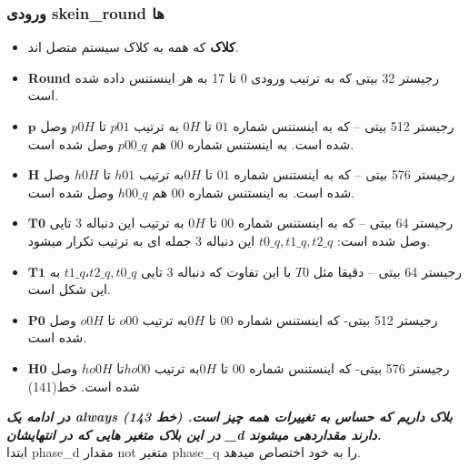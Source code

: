 \subsubsection{
	ورودی skein\_round ها
}
\begin{itemize}
	\item
	      \textbf{کلاک}
	      که همه به کلاک سیستم متصل اند.
	\item
	      \textbf{Round}
	      رجیستر 32 بیتی که به ترتیب ورودی 0 تا 17 به هر اینستنس داده شده است.
	\item
	      \textbf{$\textbf{p}$} 
	      رجیستر 512 بیتی – که به اینستنس شماره $01$ تا $0H$ به ترتیب $p01$ تا $p0H$ وصل شده است. به اینستنس شماره $00$ هم $p00\_q$ وصل شده است.
	\item
	      \textbf{$\textbf{H}$}
	      رجیستر 576 بیتی – که به اینستنس شماره $01$ تا $0H $به ترتیب $h01$ تا $h0H$ وصل شده است. به اینستنس شماره $00$ هم $h00\_q$ وصل شده است.
	\item
	      \textbf{$\textbf{T0}$}
	      رجیستر 64 بیتی –   که به اینستنس شماره $00$ تا $0H$ به ترتیب این دنباله 3 تایی وصل شده است:
	      $t0\_q, t1\_q, t2\_q$
	      این دنباله 3 جمله ای به ترتیب تکرار میشود.
	\item
	      \textbf{$\textbf{T1}$}
	      رجیستر 64 بیتی – دقیقا مثل $T0$ با این تفاوت که دنباله 3 تایی $ t1\_q، t2\_q, t0\_q $ به این شکل است.
	\item
	      \textbf{$\textbf{P0}$}
	      رجیستر 512 بیتی- که اینستنس شماره $00$ تا $0H$به ترتیب $o00$ تا $o0H$ وصل شده است. 
	\item
	      \textbf{$\textbf{H0}$}
	      رجیستر 576 بیتی- که اینستنس شماره $00$ تا $0H $به ترتیب $ho00 $تا $ho0H$ وصل شده است. خط(141)
	      
\end{itemize}
\textit{\textbf{
	در ادامه یک always بلاک داریم که حساس به تغییرات همه چیز است. (خط 143)
	در این بلاک متغیر هایی که در انتهایشان
	\_d
دارند مقداردهی میشوند.}}\\
ابتدا phase\_d مقدار not متغیر phase\_q را به خود اختصاص میدهد.
